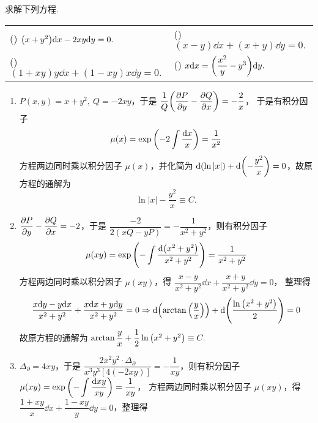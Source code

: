 \begin{example}
    求解下列方程.
    \setcounter{magicrownumbers}{0}
    \begin{table}[H]
        \centering
        \begin{tabular}{l | l}
            (\rownumber{}) $\qty(x+y^2)\dd x-2xy\dd y=0.$ & (\rownumber{}) $(x-y)\dd x+(x+y)\dd y=0.$              \\
            (\rownumber{}) $(1+xy)y\dd x+(1-xy)x\dd y=0.$ & (\rownumber{}) $x\dd x=\qty(\dfrac{x^2}{y}-y^3)\dd y.$ \\
        \end{tabular}
    \end{table}
\end{example}
\begin{solution}
    \begin{enumerate}[label=(\arabic{*})]
        \item $P(x,y)=x+y^2,~Q=-2xy$，于是 $\dfrac{1}{Q}\qty(\displaystyle\pdv{P}{y}-\pdv{Q}{x})=-\dfrac{2}{x}$，
              于是有积分因子 $$\mu(x)=\exp\qty(-2\displaystyle\int\dfrac{\dd x}{x})=\dfrac{1}{x^2}$$
              方程两边同时乘以积分因子 $\mu(x)$，并化简为 $\dd \qty(\ln|x|)+\dd \qty(-\dfrac{y^2}{x})=0$，故原方程的通解为 $$\ln|x|-\dfrac{y^2}{x}\equiv C.$$
        \item $\displaystyle\pdv{P}{y}-\pdv{Q}{x}=-2$，于是 $\dfrac{-2}{2(xQ-yP)}=-\dfrac{1}{x^2+y^2}$，则有积分因子 $$\mu(xy)=\exp\qty(-\displaystyle\int\dfrac{\dd \qty(x^2+y^2)}{x^2+y^2})=\dfrac{1}{x^2+y^2}$$
              方程两边同时乘以积分因子 $\mu(xy)$，得 $\dfrac{x-y}{x^2+y^2}\dd x+\dfrac{x+y}{x^2+y^2}\dd y=0$，
              整理得 $$\dfrac{x\dd y-y\dd x}{x^2+y^2}+\dfrac{x\dd x+y\dd y}{x^2+y^2}=0\Rightarrow \dd \qty(\arctan\qty(\dfrac{y}{x}))+\dd \qty(\dfrac{\ln\qty(x^2+y^2)}{2})=0$$
              故原方程的通解为 $\arctan\dfrac{y}{x}+\dfrac{1}{2}\ln\qty(x^2+y^2)\equiv C.$
        \item $\Delta_\partial=4xy$，于是 $\dfrac{2x^2y^2\cdot\Delta_\partial}{x^3y^3[4(-2xy)]}=-\dfrac{1}{xy}$，则有积分因子 $\mu(xy)=\exp\qty(-\displaystyle\int\dfrac{\dd xy}{xy})=\dfrac{1}{xy}$，
              方程两边同时乘以积分因子 $\mu(xy)$，得 $\dfrac{1+xy}{x}\dd x+\dfrac{1-xy}{y}\dd y=0$，整理得
\end{enumerate}
\end{solution}
